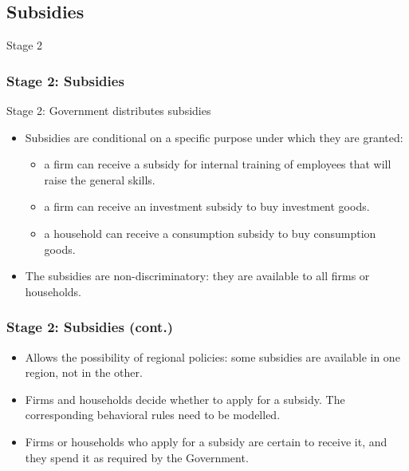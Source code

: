 \documentclass{beamer}
\begin{document}
\subsection{Subsidies}
\begin{frame}{Stage 2}
\frametitle{Stage 2: Subsidies}
Stage 2: Government distributes subsidies
\begin{itemize}
\item Subsidies are conditional on a specific purpose under which they
are granted:
    \begin{itemize}
    \item a firm can receive a subsidy for internal training of employees that
    will raise the general skills.
    \item a firm can receive an investment subsidy to buy investment goods.
    \item a household can receive a consumption subsidy to buy consumption goods.
    \end{itemize}
\item The subsidies are non-discriminatory: they are available to all firms or households. 
\end{itemize}
\end{frame}

\begin{frame}{}
\frametitle{Stage 2: Subsidies (cont.)}
\begin{itemize}
\item Allows the possibility of regional policies:
some subsidies are available in one region, not in the other.
\item Firms and households decide whether to apply for a subsidy.
The corresponding behavioral rules need to be modelled.
\item Firms or households who apply for a subsidy are certain to receive it, and
they spend it as required by the Government.
\end{itemize}
\end{frame}
\end{document}

